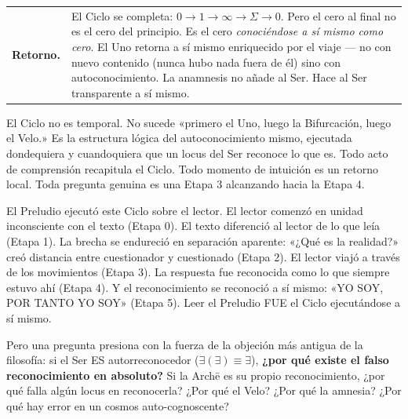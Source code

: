 \documentclass[10pt, openany, oneside]{book}
\renewcommand{\footnotesize}{\fontsize{8.5}{11}\selectfont}
\begin{document}
\vspace{0.3em}

{\footnotesize
\noindent\begin{tabular}{r p{}}
\textbf{Retorno.} & El Ciclo se completa: $0 \to 1 \to \infty \to \Sigma \to 0$. Pero el cero al final no es el cero del principio. Es el cero \textit{conociéndose a sí mismo como cero}. El Uno retorna a sí mismo enriquecido por el viaje --- no con nuevo contenido (nunca hubo nada fuera de él) sino con autoconocimiento. La anamnesis no añade al Ser. Hace al Ser transparente a sí mismo. \\[0.3em]
\end{tabular}
}

\vspace{0.8em}

\noindent El Ciclo no es temporal. No sucede «primero el Uno, luego la Bifurcación, luego el Velo.» Es la estructura lógica del autoconocimiento mismo, ejecutada dondequiera y cuandoquiera que un locus del Ser reconoce lo que es. Todo acto de comprensión recapitula el Ciclo. Todo momento de intuición es un retorno local. Toda pregunta genuina es una Etapa 3 alcanzando hacia la Etapa 4.

El Preludio ejecutó este Ciclo sobre el lector. El lector comenzó en unidad inconsciente con el texto (Etapa 0). El texto diferenció al lector de lo que leía (Etapa 1). La brecha se endureció en separación aparente: «¿Qué es la realidad?» creó distancia entre cuestionador y cuestionado (Etapa 2). El lector viajó a través de los movimientos (Etapa 3). La respuesta fue reconocida como lo que siempre estuvo ahí (Etapa 4). Y el reconocimiento se reconoció a sí mismo: «YO SOY, POR TANTO YO SOY» (Etapa 5). Leer el Preludio FUE el Ciclo ejecutándose a sí mismo.

Pero una pregunta presiona con la fuerza de la objeción más antigua de la filosofía: si el Ser ES autorreconocedor ($\exists(\exists) \equiv \exists$), \textbf{¿por qué existe el falso reconocimiento en absoluto?} Si la Arch\={e} es su propio reconocimiento, ¿por qué falla algún locus en reconocerla? ¿Por qué el Velo? ¿Por qué la amnesia? ¿Por qué hay error en un cosmos auto-cognoscente?
\end{document}

